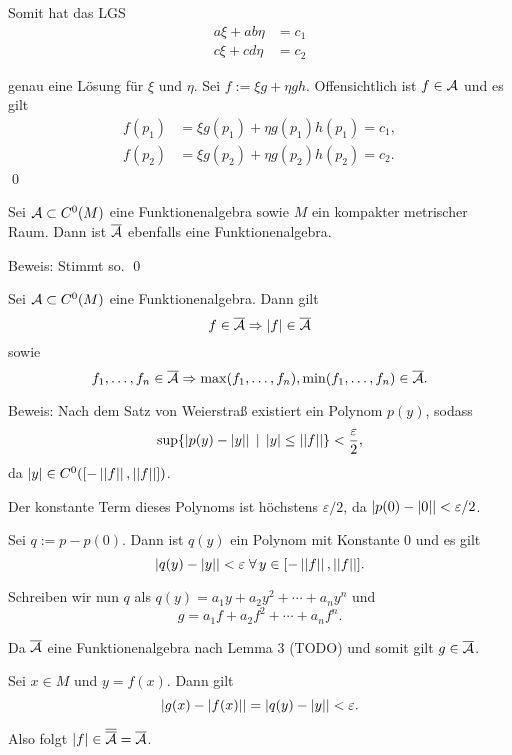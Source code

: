 \begin{frame}
    Somit hat das LGS 
    \begin{align*}
        a \xi + ab \eta &= c_1 \\
        c \xi + cd \eta &= c_2
    \end{align*}

    genau eine Lösung für \( \xi \) und \( \eta \). 
    \pause
    Sei \( f := \xi g + \eta g h \). Offensichtlich ist \( f \in \mathcal{A} \) und es gilt 
    \begin{align*}
        f(p_1) &= \xi g(p_1) + \eta g(p_1) h(p_1) = c_1, \\
        f(p_2) &= \xi g(p_2) + \eta g(p_2) h(p_2) = c_2.
    \end{align*}
    \qed
\end{frame}

\begin{frame}
    \begin{lem}
        Sei \( \mathcal{A} \subset C^0(M) \) eine Funktionenalgebra 
        sowie \(M\) ein kompakter metrischer Raum.
        Dann ist \( \overline{\mathcal{A}} \) ebenfalls eine Funktionenalgebra.
    \end{lem}
    Beweis: \pause 
    Stimmt so. \qed
\end{frame}

\begin{frame}
    \begin{lem}
        Sei \( \mathcal{A} \subset C^0(M) \) eine Funktionenalgebra. Dann gilt 
        \[ f \in \overline{\mathcal{A}} \Rightarrow \left|f\right| \in \overline{\mathcal{A}} \]
        sowie 
        \[ f_1, \ldots, f_n \in \overline{\mathcal{A}} \Rightarrow \max(f_1,\ldots, f_n), \min(f_1,\ldots, f_n) \in \overline{\mathcal{A}}. \]
    \end{lem} \pause
    Beweis:
    Nach dem Satz von Weierstraß existiert ein Polynom 
    \( p(y) \), sodass 
    \[ \sup \{ \left| p(y) - \left|y\right| \right| 
    \;|\; \left|y\right| \leq \left|\left|f\right|\right| \} < \frac{\varepsilon}{2}, \]
    da \( \left|y\right| \in C^0([-\left|\left|f\right|\right|, \left|\left|f\right|\right|]) \). 
    \pause

    Der konstante Term dieses Polynoms ist höchstens \( \varepsilon / 2 \), 
    da \( \left| p(0) - \left|0\right| \right| < \varepsilon/2 \).
\end{frame}

\begin{frame}
    Sei \( q := p - p(0) \). Dann ist \( q(y) \) ein 
    Polynom mit Konstante \(0\) und es gilt 
    \[ \abs{ q(y) - \abs{y} } < \varepsilon 
    \;\forall y \in [-\norm{f}, \norm{f}]. \]
    \pause

    Schreiben wir nun \( q \) als 
    \( q(y) = a_1 y + a_2 y^2 + \cdots + a_n y^n \) und 
    \[ g = a_1 f + a_2 f^2 + \cdots + a_n f^n. \]
    \pause

    Da \( \overline{\mathcal{A}} \) eine Funktionenalgebra nach Lemma 3 (TODO)
    und somit gilt 
    \( g \in \overline{\mathcal{A}} \). 
    \pause

    Sei \( x\in M \) und \( y = f(x) \). Dann gilt 
    \[ \left| g(x) - \left|f(x)\right| \right| = \left| q(y) - \left|y\right| \right| < \varepsilon. \]
    \pause
    
    Also folgt \( \left|f\right| \in \overline{\overline{\mathcal{A}}} = \overline{\mathcal{A}} \). 
\end{frame}

